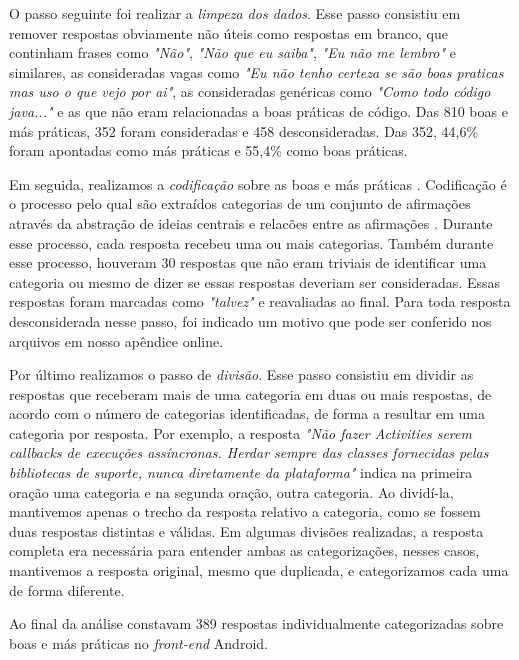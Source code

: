 O passo seguinte foi realizar a \textit{limpeza dos dados}. Esse passo consistiu em remover respostas obviamente não úteis como respostas em branco, que continham frases como \textit{"Não"}, \textit{"Não que eu saiba"}, \textit{"Eu não me lembro"} e similares, as consideradas vagas como \textit{"Eu não tenho certeza se são boas praticas mas uso o que vejo por ai"}, as consideradas genéricas como \textit{"Como todo código java..."} e as que não eram relacionadas a boas práticas de código. Das 810 boas e más práticas, 352 foram consideradas e 458 desconsideradas. Das 352, 44,6\% foram apontadas como más práticas e 55,4\% como boas práticas. 

Em seguida, realizamos a \textit{codificação} sobre as boas e más práticas \cite{Strauss2007,Saldana2013}. Codificação é o processo pelo qual são extraídos categorias de um conjunto de afirmações através da abstração de ideias centrais e relacões entre as afirmações \cite{Strauss2007}. Durante esse processo, cada resposta recebeu uma ou mais categorias. Também durante esse processo, houveram 30 respostas que não eram triviais de identificar uma categoria ou mesmo de dizer se essas respostas deveriam ser consideradas. Essas respostas foram marcadas como \textit{"talvez"} e reavaliadas ao final. Para toda resposta desconsiderada nesse passo, foi indicado um motivo que pode ser conferido nos arquivos em nosso apêndice online.

Por último realizamos o passo de \textit{divisão}. Esse passo consistiu em dividir as respostas que receberam mais de uma categoria em duas ou mais respostas, de acordo com o número de categorias identificadas, de forma a resultar em uma categoria por resposta. Por exemplo, a resposta \textit{"Não fazer Activities serem callbacks de execuções assíncronas. Herdar sempre das classes fornecidas pelas bibliotecas de suporte, nunca diretamente da plataforma"} indica na primeira oração uma categoria e na segunda oração, outra categoria. Ao dividí-la, mantivemos apenas o trecho da resposta relativo a categoria, como se fossem duas respostas distintas e válidas. Em algumas divisões realizadas, a resposta completa era necessária para entender ambas as categorizações, nesses casos, mantivemos a resposta original, mesmo que duplicada, e categorizamos cada uma de forma diferente. 

Ao final da análise constavam 389 respostas individualmente categorizadas sobre boas e más práticas no \textit{front-end} Android.




